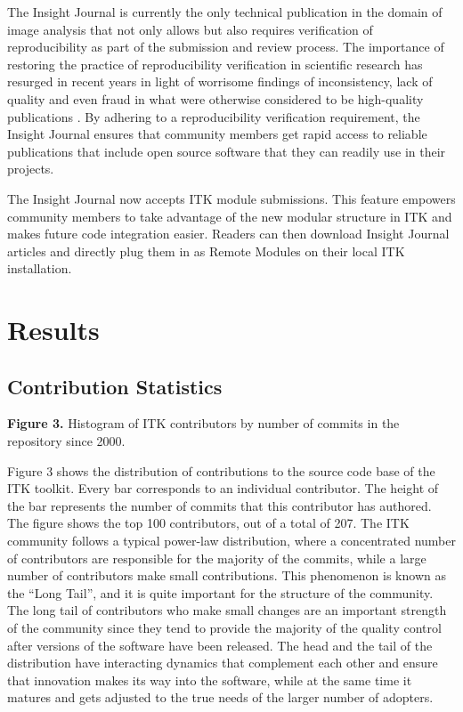 \documentclass{frontiersENG} %
\begin{document}
The Insight Journal is currently the only technical
publication in the domain of image analysis that not only allows but also
requires verification of reproducibility as part of the submission and review
process. The importance of restoring the practice of reproducibility
verification in scientific research has resurged in recent years in light of
worrisome findings of inconsistency, lack of quality and even fraud in what
were otherwise considered to be high-quality publications \cite{Begley2012}. By
adhering to a reproducibility verification requirement, the Insight Journal
ensures that community members get rapid access to reliable publications that
include open source software that they can readily use in their projects.

The Insight Journal now accepts ITK module submissions. This feature empowers
community members to take advantage of the new modular structure in ITK and
makes future code integration easier. Readers can then download Insight Journal
articles and directly plug them in as Remote Modules on their local ITK
installation.




\section{Results}



\subsection{Contribution Statistics}

\textbf{Figure 3. }{Histogram of ITK contributors by number of commits in the repository since 2000.}\label{fig:03}

Figure 3 shows the distribution of contributions
to the source code base of the ITK toolkit. Every bar corresponds to an individual
contributor. The height of the bar represents the number of commits that this
contributor has authored. The figure shows the top 100 contributors, out of a
total of 207. The ITK community follows a typical power-law distribution, where
a concentrated number of contributors are responsible for the majority of the
commits, while a large number of contributors make small contributions.  This
phenomenon is known as the ``Long Tail'', and it is quite important for the
structure of the community. The long tail of contributors who make small
changes are an important strength of the community since they tend to provide
the majority of the quality control after versions of the software have been
released. The head and the tail of the distribution have interacting dynamics
that complement each other and ensure that innovation makes its way into the
software, while at the same time it matures and gets adjusted to the true needs
of the larger number of adopters.
\end{document}
